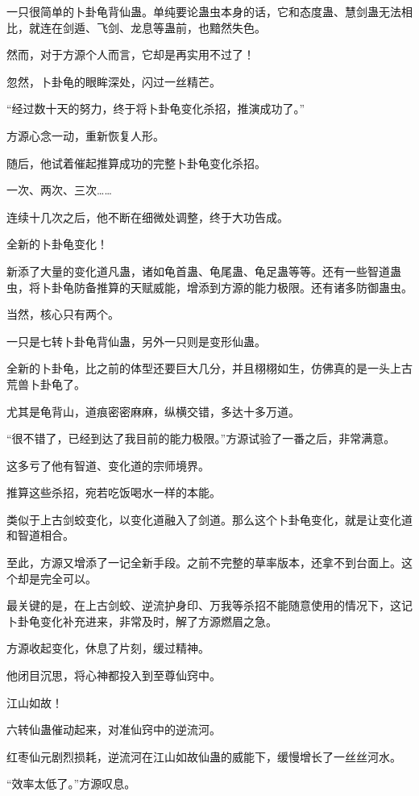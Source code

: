 \begin{this_body}
一只很简单的卜卦龟背仙蛊。单纯要论蛊虫本身的话，它和态度蛊、慧剑蛊无法相比，就连在剑遁、飞剑、龙息等蛊前，也黯然失色。

然而，对于方源个人而言，它却是再实用不过了！

忽然，卜卦龟的眼眸深处，闪过一丝精芒。

“经过数十天的努力，终于将卜卦龟变化杀招，推演成功了。”

方源心念一动，重新恢复人形。

随后，他试着催起推算成功的完整卜卦龟变化杀招。

一次、两次、三次……

连续十几次之后，他不断在细微处调整，终于大功告成。

全新的卜卦龟变化！

新添了大量的变化道凡蛊，诸如龟首蛊、龟尾蛊、龟足蛊等等。还有一些智道蛊虫，将卜卦龟防备推算的天赋威能，增添到方源的能力极限。还有诸多防御蛊虫。

当然，核心只有两个。

一只是七转卜卦龟背仙蛊，另外一只则是变形仙蛊。

全新的卜卦龟，比之前的体型还要巨大几分，并且栩栩如生，仿佛真的是一头上古荒兽卜卦龟了。

尤其是龟背山，道痕密密麻麻，纵横交错，多达十多万道。

“很不错了，已经到达了我目前的能力极限。”方源试验了一番之后，非常满意。

这多亏了他有智道、变化道的宗师境界。

推算这些杀招，宛若吃饭喝水一样的本能。

类似于上古剑蛟变化，以变化道融入了剑道。那么这个卜卦龟变化，就是让变化道和智道相合。

至此，方源又增添了一记全新手段。之前不完整的草率版本，还拿不到台面上。这个却是完全可以。

最关键的是，在上古剑蛟、逆流护身印、万我等杀招不能随意使用的情况下，这记卜卦龟变化补充进来，非常及时，解了方源燃眉之急。

方源收起变化，休息了片刻，缓过精神。

他闭目沉思，将心神都投入到至尊仙窍中。

江山如故！

六转仙蛊催动起来，对准仙窍中的逆流河。

红枣仙元剧烈损耗，逆流河在江山如故仙蛊的威能下，缓慢增长了一丝丝河水。

“效率太低了。”方源叹息。


\end{this_body}
